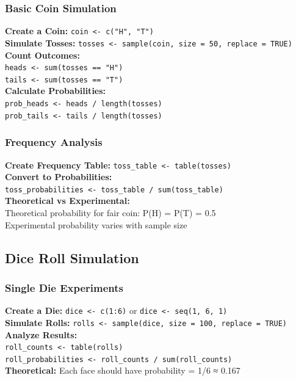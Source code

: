 \documentclass[11pt,a4paper]{article}
\begin{document}
\subsubsection{Basic Coin Simulation}

\begin{probabilitybox}
\textbf{Create a Coin:} \texttt{coin <- c("H", "T")}\\[0.3cm]
\textbf{Simulate Tosses:} \texttt{tosses <- sample(coin, size = 50, replace = TRUE)}\\[0.3cm]
\textbf{Count Outcomes:}\\
\texttt{heads <- sum(tosses == "H")}\\
\texttt{tails <- sum(tosses == "T")}\\[0.3cm]
\textbf{Calculate Probabilities:}\\
\texttt{prob\_heads <- heads / length(tosses)}\\
\texttt{prob\_tails <- tails / length(tosses)}
\end{probabilitybox}

\subsubsection{Frequency Analysis}

\begin{probabilitybox}
\textbf{Create Frequency Table:} \texttt{toss\_table <- table(tosses)}\\[0.3cm]
\textbf{Convert to Probabilities:}\\
\texttt{toss\_probabilities <- toss\_table / sum(toss\_table)}\\[0.3cm]
\textbf{Theoretical vs Experimental:}\\
Theoretical probability for fair coin: P(H) = P(T) = 0.5\\
Experimental probability varies with sample size
\end{probabilitybox}

\subsection{Dice Roll Simulation}

\subsubsection{Single Die Experiments}

\begin{probabilitybox}
\textbf{Create a Die:} \texttt{dice <- c(1:6)} or \texttt{dice <- seq(1, 6, 1)}\\[0.3cm]
\textbf{Simulate Rolls:} \texttt{rolls <- sample(dice, size = 100, replace = TRUE)}\\[0.3cm]
\textbf{Analyze Results:}\\
\texttt{roll\_counts <- table(rolls)}\\
\texttt{roll\_probabilities <- roll\_counts / sum(roll\_counts)}\\[0.3cm]
\textbf{Theoretical:} Each face should have probability = 1/6 ≈ 0.167
\end{probabilitybox}
\end{document}
